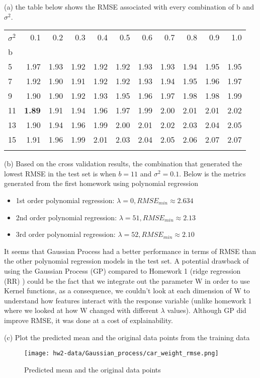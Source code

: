 \documentclass[11pt]{report}
\begin{document}
\justify (a) the table below shows the RMSE associated with every combination of b and $\sigma^{2}$. 

\begin{center}
\begin{tabular}{lrrrrrrrrrr}
\toprule
\;\;\;  $\sigma^2$ &   0.1 &   0.2 &   0.3 &   0.4 &   0.5 &   0.6 &   0.7 &   0.8 &   0.9 &   1.0 \\
b  &       &       &       &       &       &       &       &       &       &       \\
\midrule
5  &  1.97 &  1.93 &  1.92 &  1.92 &  1.92 &  1.93 &  1.93 &  1.94 &  1.95 &  1.95 \\
7  &  1.92 &  1.90 &  1.91 &  1.92 &  1.92 &  1.93 &  1.94 &  1.95 &  1.96 &  1.97 \\
9  &  1.90 &  1.90 &  1.92 &  1.93 &  1.95 &  1.96 &  1.97 &  1.98 &  1.98 &  1.99 \\
11 &  \textbf{1.89} &  1.91 &  1.94 &  1.96 &  1.97 &  1.99 &  2.00 &  2.01 &  2.01 &  2.02 \\
13 &  1.90 &  1.94 &  1.96 &  1.99 &  2.00 &  2.01 &  2.02 &  2.03 &  2.04 &  2.05 \\
15 &  1.91 &  1.96 &  1.99 &  2.01 &  2.03 &  2.04 &  2.05 &  2.06 &  2.07 &  2.07 \\
\bottomrule
\label{table:rmse_table}
\end{tabular}
\end{center}

\justify (b) Based on the cross validation results, the combination that generated the lowest RMSE in the test set is when $b=11$ and $\sigma^2=0.1$. Below is the metrics generated from the first homework using polynomial regression
\begin{itemize}
	\item 1st order polynomial regression: $\lambda = 0, RMSE_{min} \approx 2.634$
	\item 2nd order polynomial regression: $\lambda = 51, RMSE_{min} \approx 2.13$
	\item 3rd order polynomial regression: $\lambda = 52, RMSE_{min} \approx 2.10$
\end{itemize} 

\justify It seems that Gaussian Process had a better performance in terms of RMSE than the other polynomial regression models in the test set. A potential drawback of using the Gaussian Process (GP) compared to Homework 1 (ridge regression (RR) ) could be the fact that we integrate out the parameter W in order to use Kernel functions, as a consequence,  we couldn't look at each dimension of W to understand how features interact with the response variable (unlike homework 1 where we looked at how W changed with different $\lambda$ values). Although GP did improve RMSE, it was done at a cost of explainability. 

\pagebreak
\justify (c) Plot the predicted mean and the original data points from the training data
\begin{figure}[h]
\texttt{[image: hw2-data/Gaussian\_process/car\_weight\_rmse.png]}
\centering
\caption{Predicted mean and the original data points}
\label{fig:car_weight_rmse}
\end{figure}
\end{document}
